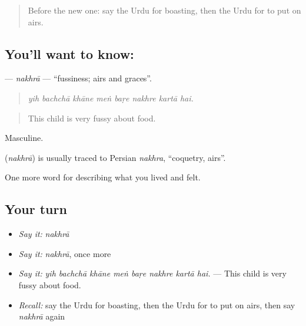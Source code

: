 \label{lesson:UR-C452-nakhra}



\begin{quote}
Before the new one: say the Urdu for boasting, then the Urdu for to put on airs.
\end{quote}

\subsection*{You'll want to know: }
\textbf{} — \emph{nakhrā} — \textquotedblleft{}fussiness; airs and graces\textquotedblright{}.

\begin{quote}
       
\end{quote}

\begin{quote}
\emph{yih bachchā khāne meṅ baṛe nakhre kartā hai.}
\end{quote}

\begin{quote}
This child is very fussy about food.
\end{quote}

Masculine.

\begin{cousinweb}
\textbf{} (\emph{nakhrā}) is usually traced to Persian \emph{nakhra}, \textquotedblleft{}coquetry, airs\textquotedblright{}.
\end{cousinweb}

\begin{grammarlens}[title={What you've built}]
One more word for describing what you lived and felt.
\end{grammarlens}

\subsection*{Your turn}
\begin{itemize}
\raggedright
  \item \emph{Say it:} \emph{nakhrā}
  \item \emph{Say it:} \emph{nakhrā}, once more
  \item \emph{Say it:} \emph{yih bachchā khāne meṅ baṛe nakhre kartā hai.} — This child is very fussy about food.
  \item \emph{Recall:} say the Urdu for boasting, then the Urdu for to put on airs, then say \emph{nakhrā} again
\end{itemize}

